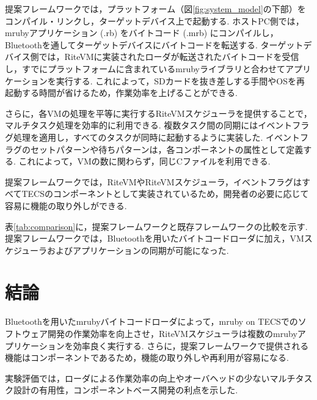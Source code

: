 \documentclass[a4j,10pt,twocolumn]{utf8/abstract}
\begin{document}
提案フレームワークでは，プラットフォーム（図\ref{fig:system_model}の下部）をコンパイル・リンクし，ターゲットデバイス上で起動する.
ホストPC側では，mrubyアプリケーション (.rb) をバイトコード (.mrb) にコンパイルし，Bluetoothを通してターゲットデバイスにバイトコードを転送する.
ターゲットデバイス側では，RiteVMに実装されたローダが転送されたバイトコードを受信し，すでにプラットフォームに含まれているmrubyライブラリと合わせてアプリケーションを実行する.
これによって，SDカードを抜き差しする手間やOSを再起動する時間が省けるため，作業効率を上げることができる.

さらに，各VMの処理を平等に実行するRiteVMスケジューラを提供することで，マルチタスク処理を効率的に利用できる.
複数タスク間の同期にはイベントフラグ処理を適用し，すべてのタスクが同時に起動するように実装した.
イベントフラグのセットパターンや待ちパターンは，各コンポーネントの属性として定義する.
これによって，VMの数に関わらず，同じCファイルを利用できる.

提案フレームワークでは，RiteVMやRiteVMスケジューラ，イベントフラグはすべてTECSのコンポーネントとして実装されているため，開発者の必要に応じて容易に機能の取り外しができる.

表\ref{tab:comparison}に，提案フレームワークと既存フレームワークの比較を示す.
提案フレームワークでは，Bluetoothを用いたバイトコードローダに加え，VMスケジューラおよびアプリケーションの同期が可能になった.

\section{結論}
Bluetoothを用いたmrubyバイトコードローダによって，mruby on TECSでのソフトウェア開発の作業効率を向上させ，RiteVMスケジューラは複数のmrubyアプリケーションを効率良く実行する.
さらに，提案フレームワークで提供される機能はコンポーネントであるため，機能の取り外しや再利用が容易になる.

実験評価では，ローダによる作業効率の向上やオーバヘッドの少ないマルチタスク設計の有用性，コンポーネントベース開発の利点を示した.
\end{document}
